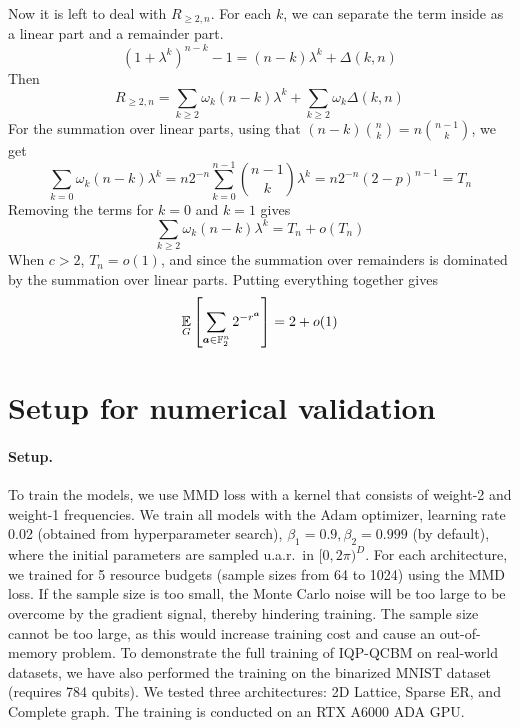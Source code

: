 \documentclass{article}
\theoremstyle{plain}
\theoremstyle{definition}
\theoremstyle{remark}
\begin{document}
Now it is left to deal with $R_{\ge2,n}$. For each $k$, we can separate the term inside as a linear part and a remainder part. \begin{equation*}
(1+\lambda^k)^{n-k} - 1 = (n-k)\lambda^k + \Delta(k,n)
\end{equation*}
Then \begin{equation*}
    R_{\ge2,n} = \sum_{k\geq 2} \omega_k (n-k)\lambda^k + \sum_{k\geq 2} \omega_k\Delta(k,n)
\end{equation*}
For the summation over linear parts, using that $(n-k)\binom{n}{k} = n \binom{n-1}{k}$, we get 
\begin{equation*}
    \sum_{k=0} \omega_k (n-k)\lambda^k = n2^{-n} \sum_{k=0}^{n-1} \binom{n-1}{k} \lambda^k = n2^{-n}(2-p)^{n-1} = T_n
\end{equation*}
Removing the terms for $k=0$ and $k=1$ gives
\begin{equation*}
    \sum_{k\geq 2} \omega_k (n-k)\lambda^k = T_n + o(T_n)
\end{equation*}
When $c>2$, $T_n = o(1)$, and since the summation over remainders is dominated by the summation over linear parts. Putting everything together gives
\begin{equation*}
    \operatorname*{\mathbb{E}}_G\left[\sum_{{\bm{a}} \in \mathbb{F}_2^n}  2^{-r^{\bm{a}}}\right] = 2 + o(1)
\end{equation*}


\section{Setup for numerical validation}\label{sec:setup}
\paragraph{Setup.} To train the models, we use MMD loss with a kernel that consists of weight-2 and weight-1 frequencies. We train all models with the Adam optimizer, learning rate 0.02 (obtained from hyperparameter search), $\beta_1=0.9, \beta_2=0.999$ (by default), where the initial parameters are sampled u.a.r.~in $[0, 2\pi)^D$. For each architecture, we trained for 5 resource budgets (sample sizes from 64 to 1024) using the MMD loss. If the sample size is too small, the Monte Carlo noise will be too large to be overcome by the gradient signal, thereby hindering training. The sample size cannot be too large, as this would increase training cost and cause an out-of-memory problem.  
To demonstrate the full training of IQP-QCBM on real-world datasets, we have also performed the training on the binarized MNIST dataset (requires 784 qubits). We tested three architectures: 2D Lattice, Sparse ER, and Complete graph. The training is conducted on an RTX A6000 ADA GPU.

\newpage

\end{document}
